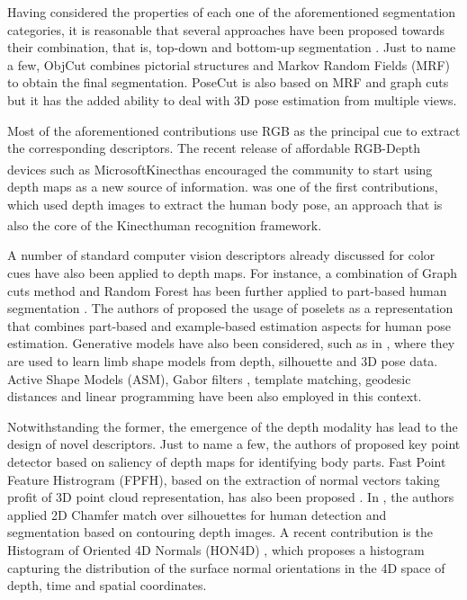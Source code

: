 \documentclass[10pt,twocolumn,letterpaper]{article}
\begin{document}
Having considered the properties of each one of the aforementioned segmentation categories, it is reasonable that several approaches have been proposed towards their combination, that is, top-down and bottom-up segmentation \cite{lin2007interactive, mori2004recovering, ladicky2010and, levin2006learning, fidler2013bottom}. Just to name a few, ObjCut \cite{kumar2005obj} combines pictorial structures and Markov Random Fields (MRF) to obtain the final segmentation. PoseCut \cite{bray2006posecut} is also based on MRF and graph cuts but it has the added ability to deal with 3D pose estimation from multiple views.
 
 Most of the aforementioned contributions use RGB as the principal cue to extract the corresponding descriptors. The recent release of affordable RGB-Depth devices such as Microsoft\textsuperscript\textregistered Kinect\textsuperscript\texttrademark has encouraged the community to start using depth maps as a new source of information. \cite{shotton2011depth} was one of the first contributions, which used depth images to extract the human body pose, an approach that is also the core of the Kinect\textsuperscript \texttrademark human recognition framework. 
 
 A number of standard computer vision descriptors already discussed for color cues have also been applied to depth maps. For instance, a combination of Graph cuts method and Random Forest has been further applied to part-based human segmentation  \cite{hernandez2012graph}. The authors of \cite{holt2011putting} proposed the usage of poselets as a representation that combines part-based and example-based estimation aspects for human pose estimation. Generative models have also been considered, such as in \cite{charles2011learning}, where they are used to learn limb shape models from depth, silhouette and 3D pose data. Active Shape Models (ASM), Gabor filters \cite{pugeault2011spelling}, template matching, geodesic distances \cite{schwarz2011estimating} and linear programming \cite{windheuser2011geometrically} have been also employed in this context.
 
Notwithstanding the former, the emergence of the depth modality has lead to the design of novel descriptors. Just to name a few, the authors of \cite{plagemann2010real} proposed key point detector based on saliency of depth maps for identifying body parts. Fast Point Feature Histrogram (FPFH), based on the extraction of normal vectors taking profit of 3D point cloud representation, has also been proposed \cite{rusu2009fast, rusu20113d, mogelmosetri}. In \cite{xia2011human}, the authors applied 2D Chamfer match over silhouettes for human detection and segmentation based on contouring depth images. A recent contribution is the Histogram of Oriented 4D Normals (HON4D) \cite{oreifej2013hon4d}, which proposes a histogram capturing the distribution of the surface normal orientations in the 4D space of depth, time and spatial coordinates.
 
\end{document}
